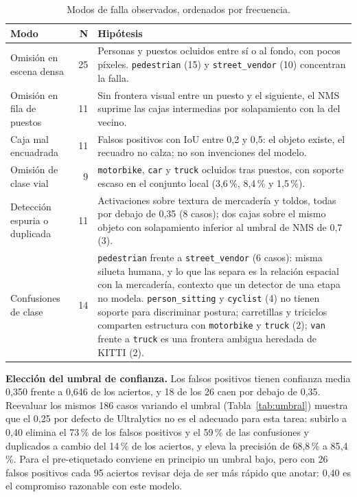 \documentclass[10pt,a4paper]{article}
\begin{document}
\begin{table}[H]
\centering\scriptsize
\caption{Modos de falla observados, ordenados por frecuencia.}
\label{tab:modos}
\begin{tabular}{@{}p{3.9cm}r p{11.4cm}@{}}
\toprule
\textbf{Modo} & \textbf{N} & \textbf{Hipótesis}\\
\midrule
Omisión en escena densa & 25 & Personas y puestos ocluidos entre sí o al fondo, con pocos píxeles. \texttt{pedestrian} (15) y \texttt{street\_vendor} (10) concentran la falla.\\
Omisión en fila de puestos & 11 & Sin frontera visual entre un puesto y el siguiente, el NMS suprime las cajas intermedias por solapamiento con la del vecino.\\
Caja mal encuadrada & 11 & Falsos positivos con IoU entre 0{,}2 y 0{,}5: el objeto existe, el recuadro no calza; no son invenciones del modelo.\\
Omisión de clase vial & 9 & \texttt{motorbike}, \texttt{car} y \texttt{truck} ocluidos tras puestos, con soporte escaso en el conjunto local (3{,}6\,\%, 8{,}4\,\% y 1{,}5\,\%).\\
Detección espuria o duplicada & 11 & Activaciones sobre textura de mercadería y toldos, todas por debajo de 0{,}35 (8 casos); dos cajas sobre el mismo objeto con solapamiento inferior al umbral de NMS de 0{,}7 (3).\\
Confusiones de clase & 14 & \texttt{pedestrian} frente a \texttt{street\_vendor} (6 casos): misma silueta humana, y lo que las separa es la relación espacial con la mercadería, contexto que un detector de una etapa no modela. \texttt{person\_sitting} y \texttt{cyclist} (4) no tienen soporte para discriminar postura; carretillas y triciclos comparten estructura con \texttt{motorbike} y \texttt{truck} (2); \texttt{van} frente a \texttt{truck} es una frontera ambigua heredada de KITTI (2).\\
\bottomrule
\end{tabular}
\end{table}

\noindent\textbf{Elección del umbral de confianza.} Los falsos positivos tienen confianza
media 0{,}350 frente a 0{,}646 de los aciertos, y 18 de los 26 caen por debajo de 0{,}35.
Reevaluar los mismos 186 casos variando el umbral (Tabla~\ref{tab:umbral}) muestra que el
0{,}25 por defecto de Ultralytics no es el adecuado para esta tarea: subirlo a 0{,}40
elimina el 73\,\% de los falsos positivos y el 59\,\% de las confusiones y duplicados a
cambio del 14\,\% de los aciertos, y eleva la precisión de 68{,}8\,\% a 85{,}4\,\%. Para el
pre-etiquetado conviene en principio un umbral bajo, pero con 26 falsos positivos cada 95
aciertos revisar deja de ser más rápido que anotar: 0{,}40 es el compromiso razonable con
este modelo.
\end{document}
